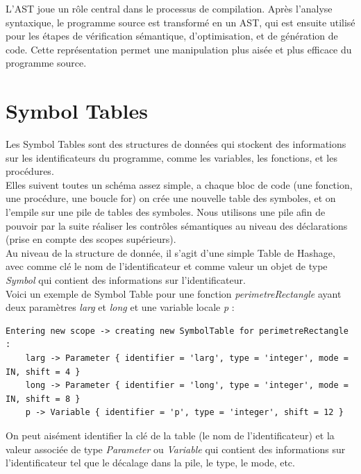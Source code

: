 \documentclass[french,a4paper]{article}
\begin{document}
    L'AST joue un rôle central dans le processus de compilation.
    Après l'analyse syntaxique, le programme source est transformé en un AST, qui est ensuite utilisé pour les étapes de vérification sémantique, d'optimisation, et de génération de code.
    Cette représentation permet une manipulation plus aisée et plus efficace du programme source.

    \section{Symbol Tables}

    Les Symbol Tables sont des structures de données qui stockent des informations sur les identificateurs du programme, comme les variables, les fonctions, et les procédures. \\

    Elles suivent toutes un schéma assez simple, a chaque bloc de code (une fonction, une procédure, une boucle for) on crée une nouvelle table des symboles, et on l'empile sur une pile de tables des symboles. Nous utilisons une pile afin de pouvoir par la suite réaliser les contrôles sémantiques au niveau des déclarations (prise en compte des scopes supérieurs).  \\


    Au niveau de la structure de donnée, il s'agit d'une simple Table de Hashage, avec comme clé le nom de l'identificateur et comme valeur un objet de type \textit{Symbol} qui contient des informations sur l'identificateur. \\

    Voici un exemple de Symbol Table pour une fonction \textit{perimetreRectangle} ayant deux paramètres \textit{larg} et \textit{long} et une variable locale \textit{p} :
    \begin{lstlisting}[label={lst:lstlisting16}]
Entering new scope -> creating new SymbolTable for perimetreRectangle  : 
    larg -> Parameter { identifier = 'larg', type = 'integer', mode = IN, shift = 4 }
    long -> Parameter { identifier = 'long', type = 'integer', mode = IN, shift = 8 }
    p -> Variable { identifier = 'p', type = 'integer', shift = 12 }
    \end{lstlisting}

    On peut aisément identifier la clé de la table (le nom de l'identificateur) et la valeur associée de type \textit{Parameter} ou \textit{Variable} qui contient des informations sur l'identificateur tel que le décalage dans la pile, le type, le mode, etc. \\
\end{document}
